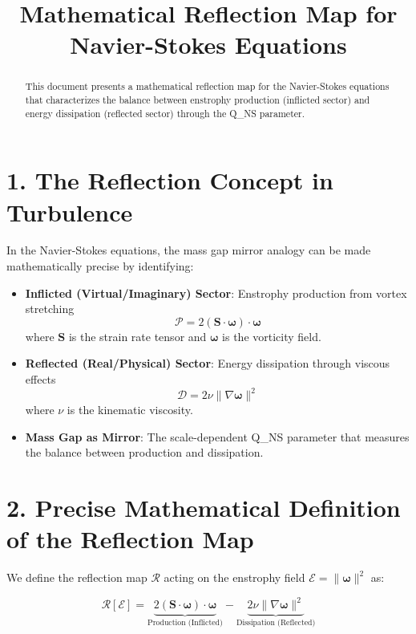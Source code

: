 \documentclass[11pt]{article}
\title{Mathematical Reflection Map for Navier-Stokes Equations}
\author{}
\date{}
\begin{document}
\maketitle
\begin{abstract}
This document presents a mathematical reflection map for the Navier-Stokes equations that characterizes the balance between enstrophy production (inflicted sector) and energy dissipation (reflected sector) through the Q_{NS} parameter.
\end{abstract}

\section{1. The Reflection Concept in Turbulence}

In the Navier-Stokes equations, the mass gap mirror analogy can be made mathematically precise by identifying:

\begin{itemize}
\item \textbf{Inflicted (Virtual/Imaginary) Sector}: Enstrophy production from vortex stretching
  \[
  \mathcal{P} = 2(\mathbf{S} \cdot \boldsymbol{\omega}) \cdot \boldsymbol{\omega}
  \]
  where \(\mathbf{S}\) is the strain rate tensor and \(\boldsymbol{\omega}\) is the vorticity field.

\item \textbf{Reflected (Real/Physical) Sector}: Energy dissipation through viscous effects
  \[
  \mathcal{D} = 2\nu \|\nabla \boldsymbol{\omega}\|^2
  \]
  where \(\nu\) is the kinematic viscosity.

\item \textbf{Mass Gap as Mirror}: The scale-dependent Q_{NS} parameter that measures the balance between production and dissipation.
\end{itemize}

\section{2. Precise Mathematical Definition of the Reflection Map}

We define the reflection map \(\mathcal{R}\) acting on the enstrophy field \(\mathcal{E} = \|\boldsymbol{\omega}\|^2\) as:

\[
\mathcal{R}[\mathcal{E}] = \underbrace{2(\mathbf{S} \cdot \boldsymbol{\omega}) \cdot \boldsymbol{\omega}}_{\text{Production (Inflicted)}} - \underbrace{2\nu \|\nabla \boldsymbol{\omega}\|^2}_{\text{Dissipation (Reflected)}}
\]
\end{document}
